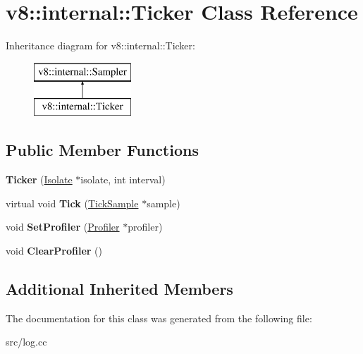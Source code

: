 \hypertarget{classv8_1_1internal_1_1_ticker}{}\section{v8\+:\+:internal\+:\+:Ticker Class Reference}
\label{classv8_1_1internal_1_1_ticker}
Inheritance diagram for v8\+:\+:internal\+:\+:Ticker\+:\begin{figure}[H]
\begin{center}
\leavevmode
\includegraphics[height=2.000000cm]{classv8_1_1internal_1_1_ticker}
\end{center}
\end{figure}
\subsection*{Public Member Functions}
\begin{DoxyCompactItemize}
\item 
\hypertarget{classv8_1_1internal_1_1_ticker_a3d6c206e5abfccfd37e9b1e8d3c17dd4}{}{\bfseries Ticker} (\hyperlink{classv8_1_1internal_1_1_isolate}{Isolate} $\ast$isolate, int interval)\label{classv8_1_1internal_1_1_ticker_a3d6c206e5abfccfd37e9b1e8d3c17dd4}

\item 
\hypertarget{classv8_1_1internal_1_1_ticker_a4c2806cf79f603b4a0026f237fb9b3ca}{}virtual void {\bfseries Tick} (\hyperlink{structv8_1_1internal_1_1_tick_sample}{Tick\+Sample} $\ast$sample)\label{classv8_1_1internal_1_1_ticker_a4c2806cf79f603b4a0026f237fb9b3ca}

\item 
\hypertarget{classv8_1_1internal_1_1_ticker_a9bd275f6dca361cb4b1d7196967b4e0e}{}void {\bfseries Set\+Profiler} (\hyperlink{classv8_1_1internal_1_1_profiler}{Profiler} $\ast$profiler)\label{classv8_1_1internal_1_1_ticker_a9bd275f6dca361cb4b1d7196967b4e0e}

\item 
\hypertarget{classv8_1_1internal_1_1_ticker_adf0f145ffacc4b5030f921efc2089193}{}void {\bfseries Clear\+Profiler} ()\label{classv8_1_1internal_1_1_ticker_adf0f145ffacc4b5030f921efc2089193}

\end{DoxyCompactItemize}
\subsection*{Additional Inherited Members}


The documentation for this class was generated from the following file\+:\begin{DoxyCompactItemize}
\item 
src/log.\+cc\end{DoxyCompactItemize}
